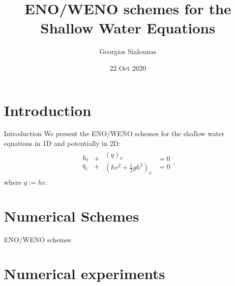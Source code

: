\documentclass{beamer}
\title[ENO/WENO schemes for shallow water]{ENO/WENO schemes for the Shallow Water  Equations}
\author{Georgios Sialounas}
\institute{UoR, ICL, MPE CDT}
\date{22 Oct 2020}
\newcommand{\qp}[1]{\left(#1\right)}
\begin{document}
	
	\begin{frame}
	\titlepage
\end{frame}


\section{Introduction}

\begin{frame}{Introduction}
We present the ENO/WENO schemes for the shallow water equations in 1D and potentially in 2D:
\begin{equation}
\begin{aligned}
\begin{array}{c}
h_t\\
q_t
\end{array}
\begin{array}{c}
+\\
+
\end{array}
\begin{array}{c}
\qp{q}_x\\
\qp{hv^2+\frac{1}{2}gh^2}_x
\end{array}
\begin{array}{c}
=0\\
=0
\end{array},
\end{aligned}
\end{equation}
where $q:=hv$.
\vskip 1cm


\end{frame}

\section{Numerical Schemes}



\begin{frame}{ENO/WENO schemes}


\end{frame}

\section{Numerical experiments}
\end{document}
